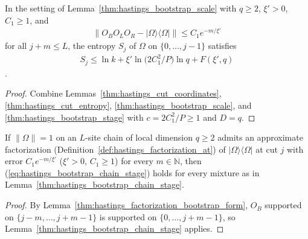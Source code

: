\begin{lemma}
    \label{thm:hastings_bootstrap_chain_stage}
    \leanok
    In the setting of Lemma~\ref{thm:hastings_bootstrap_scale} with $q\ge2$,
    $\xi'>0$, $C_1\ge1$, and
    \begin{align}
        \|O_BO_LO_R-|\Omega\rangle\langle\Omega|\|\le C_1e^{-m/\xi'}
        \label{eq:hastings_bootstrap_chain_stage_hyp}
    \end{align}
    for all $j+m\le L$, the entropy $S_j$ of $\Omega$ on $\{0,\dots,j-1\}$
    satisfies
    \begin{align}
        S_j\le\ln k+\xi'\ln\bigl(2C_1^2/P\bigr)\ln q+F(\xi',q)
        \label{eq:hastings_bootstrap_chain_stage}
    \end{align}
    \cite[Lemma~2]{Hastings2007AreaLaw}.
\end{lemma}
\begin{proof}\leanok
    Combine Lemmas~\ref{thm:hastings_cut_coordinates},
    \ref{thm:hastings_cut_entropy}, \ref{thm:hastings_bootstrap_scale}, and
    \ref{thm:hastings_bootstrap_stage} with $c=2C_1^2/P\ge1$ and $D=q$.
\end{proof}

\begin{lemma}
    \label{thm:hastings_bootstrap_factorization_at}
    \leanok
    If $\|\Omega\|=1$ on an $L$-site chain of local dimension $q\ge2$ admits an
    approximate factorization (Definition~\ref{def:hastings_factorization_at})
    of $|\Omega\rangle\langle\Omega|$ at cut $j$ with error $C_1e^{-m/\xi'}$
    ($\xi'>0$, $C_1\ge1$) for every $m\in\mathbb N$, then
    (\ref{eq:hastings_bootstrap_chain_stage}) holds for every mixture as in
    Lemma~\ref{thm:hastings_bootstrap_chain_stage}.
\end{lemma}
\begin{proof}\leanok
    By Lemma~\ref{thm:hastings_factorization_bootstrap_form}, $O_B$ supported
    on $\{j-m,\dots,j+m-1\}$ is supported on $\{0,\dots,j+m-1\}$, so
    Lemma~\ref{thm:hastings_bootstrap_chain_stage} applies.
\end{proof}


